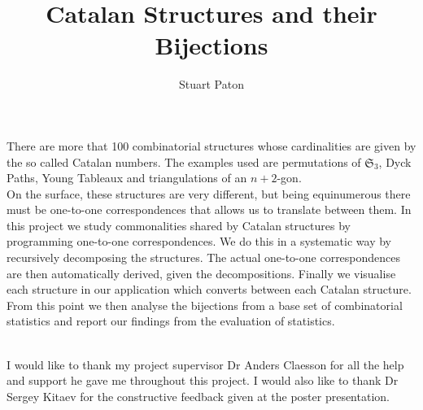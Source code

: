 \documentclass[12pt]{article}
\newcommand{\sym}{\mathfrak{S}}
\begin{document}
\title{Catalan Structures and their Bijections}
\author{Stuart Paton}

\maketitle
\thispagestyle{empty}


\begin{Abstract}
There are more that 100 combinatorial structures whose cardinalities are given by the so called Catalan numbers. The examples used are permutations of $\sym_3$, Dyck Paths, Young Tableaux and triangulations of an $n+2$-gon.\\
On the surface, these structures are very different, but being equinumerous there must be one-to-one correspondences that allows us 
to translate between them. In this project we study commonalities shared by Catalan structures by programming one-to-one 
correspondences. We do this in a systematic way by recursively decomposing the structures. The actual one-to-one correspondences are 
then automatically derived, given the decompositions. Finally we visualise each structure in our application which converts between each Catalan structure.\\ 
From this point we then analyse the bijections from a base set of combinatorial statistics and report our findings from the evaluation of statistics. 
\end{Abstract}
\clearpage

\par
{\\ }
I would like to thank my project supervisor Dr Anders Claesson for all the help and support he gave me throughout this project. I would also like to thank Dr Sergey Kitaev for the constructive feedback given at the poster presentation.
\clearpage

\tableofcontents
\newpage


\end{document}
